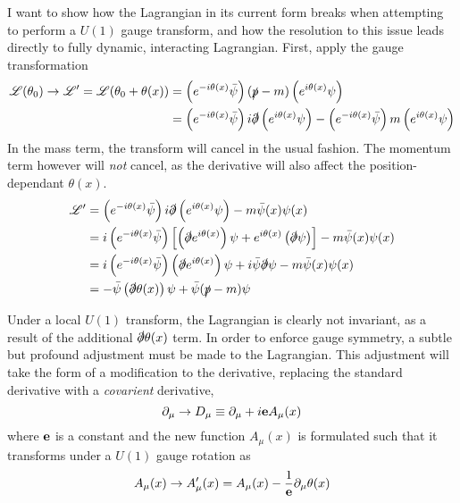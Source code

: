     I want to show how the Lagrangian in its current form breaks when attempting to perform a $U(1)$ gauge transform,
        and how the resolution to this issue leads directly to fully dynamic, interacting Lagrangian.
    First, apply the gauge transformation
    \begin{equation} \begin{split}
        \mathscr{L}(\theta_0) \to \mathscr{L}' = \mathscr{L}(\theta_0+\theta(x)) &=
            \left( e^{-i\theta(x)} \bar{\psi} \right) (\slashed{p} - m) \left( e^{i\theta(x)}\psi \right)
            \\ &= \left( e^{-i\theta(x)} \bar{\psi} \right) i\slashed{\partial} \left( e^{i\theta(x)}\psi \right)
                - \left( e^{-i\theta(x)} \bar{\psi} \right) m \left( e^{i\theta(x)}\psi \right)
    \end{split} \end{equation}
    In the mass term, the transform will cancel in the usual fashion.
    The momentum term however will \textit{not} cancel, as the derivative will also affect the position-dependant $\theta(x)$.
    \begin{equation} \begin{split}
        \mathscr{L}' &= \left( e^{-i\theta(x)} \bar{\psi} \right) i\slashed{\partial} \left( e^{i\theta(x)}\psi \right) - m \bar{\psi}(x) \psi(x)
        \\ &= i \left( e^{-i\theta(x)} \bar{\psi} \right) \left[
                \left( \slashed{\partial} e^{i\theta(x)} \right) \psi 
                + e^{i\theta(x)} \left( \slashed{\partial} \psi \right)
            \right] - m \bar{\psi}(x) \psi(x)
        \\ &= i \left( e^{-i\theta(x)} \bar{\psi} \right)
                \left( \slashed{\partial} e^{i\theta(x)} \right) \psi 
            + i \bar{\psi} \slashed{\partial} \psi
            - m \bar{\psi}(x) \psi(x)
        \\ &= - \bar{\psi} \left( \slashed{\partial}\theta(x) \right) \psi 
            + \bar{\psi} ( \slashed{p} - m ) \psi
    \end{split} \end{equation}

    Under a local $U(1)$ transform, the Lagrangian is clearly not invariant,
        as a result of the additional $\slashed{\partial}\theta(x)$ term.
    In order to enforce gauge symmetry, a subtle but profound adjustment must be made to the Lagrangian.
    This adjustment will take the form of a modification to the derivative,
        replacing the standard derivative with a \textit{covarient} derivative,
    \begin{equation}
        \partial_\mu \to D_\mu \equiv \partial_\mu + i \mathbf{e} A_\mu(x)
    \end{equation}
    where $\mathbf{e}$ is a constant and the new function $A_\mu(x)$ is formulated such that it transforms under a $U(1)$ gauge rotation as
    \begin{equation}
        A_\mu(x) \to A'_\mu(x) = A_\mu(x) - \frac{1}{\mathbf{e}} \partial_\mu \theta(x)
    \end{equation}

